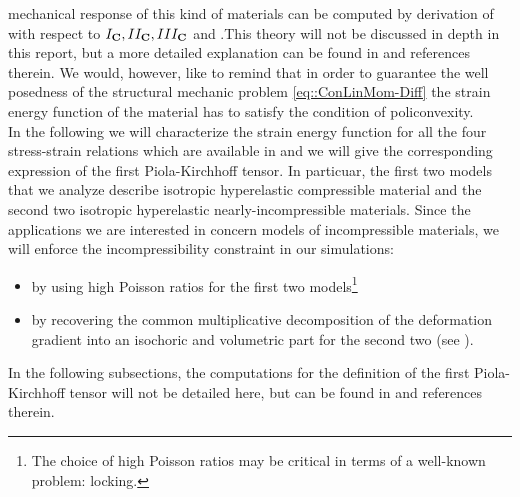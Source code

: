 mechanical response of this kind of materials can be computed by
derivation of \W with respect to $I_{\textbf{C}},II_{\textbf{C}},III_{\textbf{C}}$ and \C.This
theory will not be discussed in depth in this report, but a more
detailed explanation can be found in \cite{GM,Deluca} and references
therein. We would, however, like to remind that in order to guarantee
the well posedness of the structural mechanic problem
\eqref{eq::ConLinMom-Diff} the strain energy function \W of the
material has to satisfy the condition of policonvexity.\\ In the
following we will characterize the strain energy function for all the
four stress-strain relations which are available in \LV and we will
give the corresponding expression of the first Piola-Kirchhoff
tensor. In particuar, the first two models that we analyze describe
isotropic hyperelastic compressible material and the second two
isotropic hyperelastic nearly-incompressible materials. Since the
applications we are interested in concern models of incompressible
materials, we will enforce the incompressibility constraint in our
simulations:
\begin{itemize}
  \item by using high Poisson ratios for the first two
models\footnote{The choice of high Poisson ratios may be critical in
terms of a well-known problem: locking.}
  \item by recovering the common multiplicative decomposition of the
deformation gradient \F into an isochoric and volumetric part for the
second two (see \cite{BonetWood}).
\end{itemize} In the following subsections, the computations for the
definition of the first Piola-Kirchhoff tensor will not be detailed
here, but can be found in \cite{Deluca} and references therein.

